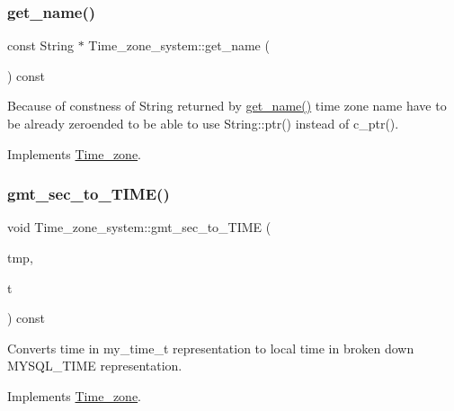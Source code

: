 \subsubsection{\texorpdfstring{get\+\_\+name()}{get\_name()}}
{\footnotesize\ttfamily const String $\ast$ Time\+\_\+zone\+\_\+system\+::get\+\_\+name (\begin{DoxyParamCaption}{ }\end{DoxyParamCaption}) const\hspace{0.3cm}{\ttfamily [virtual]}}

Because of constness of String returned by \mbox{\hyperlink{classTime__zone__system_a8bca725b2252584788aedf52366acdaf}{get\+\_\+name()}} time zone name have to be already zeroended to be able to use String\+::ptr() instead of c\+\_\+ptr(). 

Implements \mbox{\hyperlink{classTime__zone_a8116436f7b8e19dc4b99cd78a786e47f}{Time\+\_\+zone}}.

\mbox{\label{classTime__zone__system_ad32a4573aac61a30383f49d69a93bf68}} 
\subsubsection{\texorpdfstring{gmt\+\_\+sec\+\_\+to\+\_\+\+T\+I\+M\+E()}{gmt\_sec\_to\_TIME()}}
{\footnotesize\ttfamily void Time\+\_\+zone\+\_\+system\+::gmt\+\_\+sec\+\_\+to\+\_\+\+T\+I\+ME (\begin{DoxyParamCaption}\item[{M\+Y\+S\+Q\+L\+\_\+\+T\+I\+ME $\ast$}]{tmp,  }\item[{my\+\_\+time\+\_\+t}]{t }\end{DoxyParamCaption}) const\hspace{0.3cm}{\ttfamily [virtual]}}

Converts time in my\+\_\+time\+\_\+t representation to local time in broken down M\+Y\+S\+Q\+L\+\_\+\+T\+I\+ME representation. 

Implements \mbox{\hyperlink{classTime__zone_a7a15d4406de10928f8e39eb3549770a4}{Time\+\_\+zone}}.

\mbox{\label{classTime__zone__system_ad2a1613d3f1e95410c1191a61fe26749}} 
